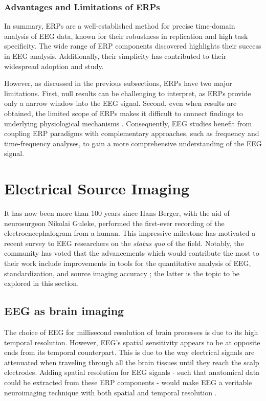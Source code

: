 \subsubsection{Advantages and Limitations of ERPs}

In summary, ERPs are a well-established method for precise time-domain analysis of EEG data, known for their robustness in replication and high task specificity. The wide range of ERP components discovered highlights their success in EEG analysis. Additionally, their simplicity has contributed to their widespread adoption and study.

However, as discussed in the previous subsections, ERPs have two major limitations. First, null results can be challenging to interpret, as ERPs provide only a narrow window into the EEG signal. Second, even when results are obtained, the limited scope of ERPs makes it difficult to connect findings to underlying physiological mechanisms \cite{cohenAnalyzingNeuralTime2014}. Consequently, EEG studies benefit from coupling ERP paradigms with complementary approaches, such as frequency and time-frequency analyses, to gain a more comprehensive understanding of the EEG signal.


\section{Electrical Source Imaging}
\label{section:ESI}

It has now been more than 100 years since Hans Berger, with the aid of neurosurgeon Nikolai Guleke, performed the first-ever recording of the electroencephalogram from a human\cite{bergerUeberElektrenkephalogrammMenschen1929}. This impressive milestone has motivated a recent survey to EEG researchers on the \textit{status quo} of the field. Notably, the community has voted that the advancements which would contribute the most to their work include improvements in tools for the quantitative analysis of EEG, standardization, and source imaging accuracy \cite{mushtaqOneHundredYears2024}; the latter is the topic to be explored in this section.

\subsection{EEG as brain imaging}

The choice of EEG for millisecond resolution of brain processes is due to its high temporal resolution. However, EEG's spatial sensitivity appears to be at opposite ends from its temporal counterpart. This is due to the way electrical signals are attenuated when traveling through all the brain tissues until they reach the scalp electrodes. Adding spatial resolution for EEG signals - such that anatomical data could be extracted from these ERP components - would make EEG a veritable neuroimaging technique with both spatial and temporal resolution \cite{luckIntroductionEventrelatedPotential2014}. 

